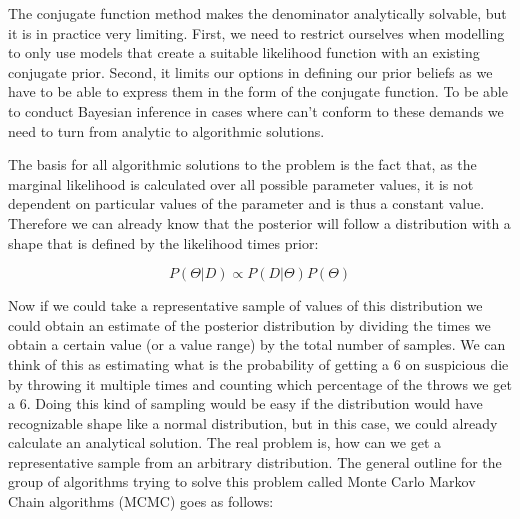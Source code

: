 \documentclass[12pt,a4paper,leqno]{report}
\theoremstyle{plain}
\theoremstyle{definition}
\theoremstyle{remark}
\begin{document}
The conjugate function method makes the denominator analytically solvable, but it
is in practice very limiting. First, we need to restrict ourselves when
modelling to only use models that create a suitable likelihood function with an existing
conjugate prior. Second, it limits our options in defining our prior
beliefs as we have to be able to express them in the form of the conjugate function. To
be able to conduct Bayesian inference in cases where can't conform to these demands we need
to turn from analytic to algorithmic solutions.

The basis for all algorithmic solutions to the problem is the fact that,
as the marginal likelihood is calculated over all possible parameter values, it is
not dependent on particular values of the parameter and is thus a constant value.
Therefore we can already know that the posterior will follow a distribution
with a shape that is defined by the likelihood times prior:

\begin{def}\label{bayespropto}
    \begin{equation}
        P(\Theta|D) \propto P(D|\Theta)P(\Theta)
    \end{equation}
\end{def}

Now if we could take a representative sample of values of this distribution we could
obtain an estimate of the posterior distribution by dividing the times we obtain a
certain value (or a value range) by the total number of samples. We can think of this
as estimating what is the probability of getting a 6 on
suspicious die by throwing it multiple times and counting which percentage of the
throws we get a 6. Doing this kind of sampling would be easy if the distribution would have
recognizable shape like a normal distribution, but in this case, we could already calculate an analytical
solution. The real problem is, how can we get a representative sample from an arbitrary
distribution. The general outline for the group of algorithms trying to solve this problem called
Monte Carlo Markov Chain algorithms (MCMC) goes as follows:
\end{document}
